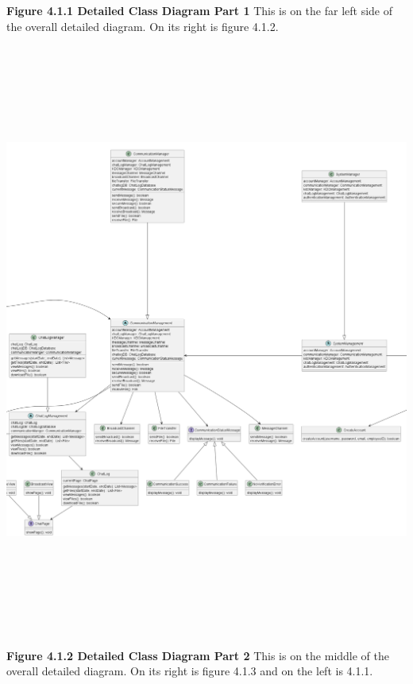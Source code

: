 \documentclass[]{article}
\begin{document}
\begin{center}
	\textbf{Figure 4.1.1 Detailed Class Diagram Part 1}
	\newline This is on the far left side of the overall detailed diagram. On its right is figure 4.1.2.
	\includegraphics[width=\textwidth,height=8in]{../images/ClassDiagram/mid.png}
	\textbf{Figure 4.1.2 Detailed Class Diagram Part 2}
	\newline This is on the middle of the overall detailed diagram. On its right is figure 4.1.3 and on the left is 4.1.1.

\end{center}
\end{document}
